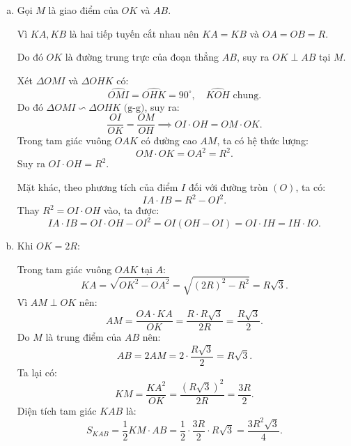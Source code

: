 \begin{bt}
{\begin{enumerate}[a)]
			Suy ra bốn điểm $K, A, O, H$ cùng thuộc đường tròn đường kính $KO$.
			\item Gọi $M$ là giao điểm của $OK$ và $AB$.
			
			Vì $KA, KB$ là hai tiếp tuyến cắt nhau nên $KA = KB$ và $OA = OB = R$.
			
			Do đó $OK$ là đường trung trực của đoạn thẳng $AB$, suy ra $OK \perp AB$ tại $M$.
			
			Xét $\Delta OMI$ và $\Delta OHK$ có:
			$$\widehat{OMI} = \widehat{OHK} = 90^\circ,\quad \widehat{KOH}\text{ chung}.$$
			Do đó $\Delta OMI \backsim \Delta OHK\text{ (g-g)}$, suy ra:
			$$\dfrac{OI}{OK} = \dfrac{OM}{OH} \implies OI \cdot OH = OM \cdot OK.$$
			Trong tam giác vuông $OAK$ có đường cao $AM$, ta có hệ thức lượng:
			$$OM \cdot OK = OA^2 = R^2.$$
			Suy ra $OI \cdot OH = R^2$.
			
			Mặt khác, theo phương tích của điểm $I$ đối với đường tròn $(O)$, ta có:
			$$IA \cdot IB = R^2 - OI^2.$$
			Thay $R^2 = OI \cdot OH$ vào, ta được:
			$$IA \cdot IB = OI \cdot OH - OI^2 = OI(OH - OI) = OI \cdot IH = IH \cdot IO.$$
			\item Khi $OK = 2R$:
			
			Trong tam giác vuông $OAK$ tại $A$:
			$$KA = \sqrt{OK^2 - OA^2} = \sqrt{(2R)^2 - R^2} = R\sqrt{3}.$$
			Vì $AM \perp OK$ nên:
			$$AM = \dfrac{OA \cdot KA}{OK} = \dfrac{R \cdot R\sqrt{3}}{2R} = \dfrac{R\sqrt{3}}{2}.$$
			Do $M$ là trung điểm của $AB$ nên:
			$$AB = 2AM = 2 \cdot \dfrac{R\sqrt{3}}{2} = R\sqrt{3}.$$
			Ta lại có:
			$$KM = \dfrac{KA^2}{OK} = \dfrac{(R\sqrt{3})^2}{2R} = \dfrac{3R}{2}.$$
			Diện tích tam giác $KAB$ là:
			$$S_{KAB} = \dfrac{1}{2} KM \cdot AB = \dfrac{1}{2} \cdot \dfrac{3R}{2} \cdot R\sqrt{3} = \dfrac{3R^2\sqrt{3}}{4}.$$
		\end{enumerate}
}
\end{bt}


